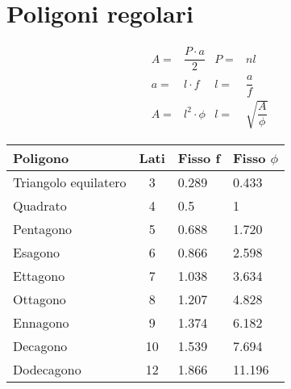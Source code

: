 \section{Poligoni regolari}
\begin{tcolorbox}[sidebyside,righthand width=9cm,colback=white,colframe=white,fonttitle=\bfseries	]
	
	\tcblower
	\begin{align*}
	A=&\dfrac{P\cdot a}{2} & P=&nl	\\
	a=&l\cdot f & l=&\dfrac{a}{f}	\\
	A=&l^2\cdot\phi&l=&\sqrt{\dfrac{A}{\phi}}
	\end{align*}
\end{tcolorbox}
\newpage
{\centering{}
	\begin{tabular}{lcll}
		\toprule
Poligono	&  Lati&  Fisso f&Fisso $\phi$ \\ 
\midrule
Triangolo equilatero	& 3 & 0.289 &0.433\\ 
Quadrato	& 4 & 0.5&1 \\ 
Pentagono	& 5 &0.688 &1.720 \\ 
Esagono	& 6 &0.866 &2.598 \\ 
Ettagono	& 7 &1.038&3.634 \\ 
Ottagono	& 8 &1.207&4.828 \\ 
Ennagono	& 9&  1.374&6.182\\ 
Decagono	& 10 & 1.539&7.694 \\ 
Dodecagono	&  12&  1.866&11.196\\
\bottomrule
\end{tabular}
\par}
